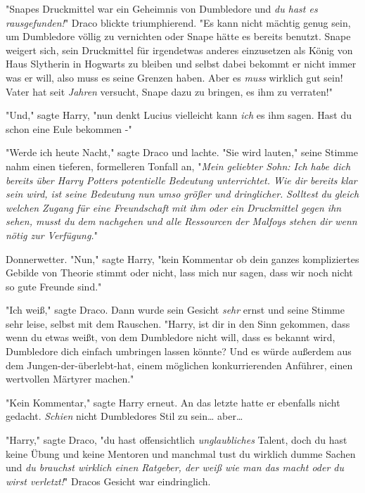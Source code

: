 {"Snapes Druckmittel war ein Geheimnis von Dumbledore und \emph{du hast es rausgefunden!}" Draco blickte triumphierend. "Es kann nicht mächtig genug sein, um Dumbledore völlig zu vernichten oder Snape hätte es bereits benutzt. Snape weigert sich, sein Druckmittel für irgendetwas anderes einzusetzen als König von Haus Slytherin in Hogwarts zu bleiben und selbst dabei bekommt er nicht immer was er will, also muss es seine Grenzen haben. Aber es \emph{muss} wirklich gut sein! Vater hat seit \emph{Jahren} versucht, Snape dazu zu bringen, es ihm zu verraten!"

"Und," sagte Harry, "nun denkt Lucius vielleicht kann \emph{ich} es ihm sagen. Hast du schon eine Eule bekommen -"

"Werde ich heute Nacht," sagte Draco und lachte. "Sie wird lauten," seine Stimme nahm einen tieferen, formelleren Tonfall an, "\emph{Mein geliebter Sohn: Ich habe dich} \emph{bereits} \emph{über Harry Potters potentielle Bedeutung unterrichtet. Wie dir bereits klar} \emph{sein wird, ist seine Bedeutung nun umso größer und dringlicher.} \emph{Solltest} \emph{du} \emph{gleich welchen} \emph{Zugang für eine Freundschaft} \emph{mit ihm} \emph{oder} \emph{ein} \emph{Druckmittel gegen ihn sehen, musst du} \emph{dem} \emph{nachgehen und alle} \emph{Ressourcen} \emph{der Malfoys stehen dir} \emph{wenn} \emph{nötig zur Verfügung.}"

Donnerwetter. "Nun," sagte Harry, "kein Kommentar ob dein ganzes kompliziertes Gebilde von Theorie stimmt oder nicht, lass mich nur sagen, dass wir noch nicht so gute Freunde sind."

"Ich weiß," sagte Draco. Dann wurde sein Gesicht \emph{sehr} ernst und seine Stimme sehr leise, selbst mit dem Rauschen. "Harry, ist dir in den Sinn gekommen, dass wenn du etwas weißt, von dem Dumbledore nicht will, dass es bekannt wird, Dumbledore dich einfach umbringen lassen könnte? Und es würde außerdem aus dem Jungen-der-überlebt-hat, einem möglichen konkurrierenden Anführer, einen wertvollen Märtyrer machen."

"Kein Kommentar," sagte Harry erneut. An das letzte hatte er ebenfalls nicht gedacht. \emph{Schien} nicht Dumbledores Stil zu sein… aber…

"Harry," sagte Draco, "du hast offensichtlich \emph{unglaubliches} Talent, doch du hast keine Übung und keine Mentoren und manchmal tust du wirklich dumme Sachen und \emph{du brauchst wirklich einen Ratgeber, der weiß wie man das macht oder du wirst verletzt!}" Dracos Gesicht war eindringlich.

}

